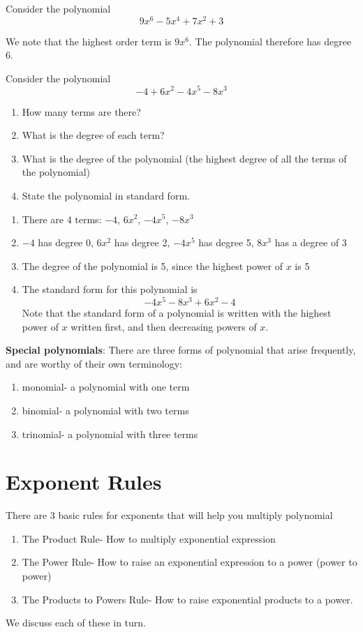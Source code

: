 \begin{myexample}
Consider the polynomial
\[
	9x^6-5x^4+7x^2+3
\]
\end{myexample}
We note that the highest order term is $9x^6$. The polynomial therefore has degree 6.
\begin{myexample}
Consider the polynomial 
\[
	-4 + 6x^2-4x^5-8x^3
\]
\begin{enumerate}
	\item How many terms are there?
	\item What is the degree of each term?
	\item What is the degree of the polynomial (the highest degree of all the terms of the polynomial)
	\item State the polynomial in standard form.
\end{enumerate} 
\end{myexample}
\begin{myProof}
	\begin{enumerate}
		\item There are 4 terms: $-4$, $6x^2$, $-4x^5$, $-8x^3$
		\item $-4$ has degree $0$, $6x^2$ has degree 2, $-4x^5$ has degree 5, $8x^3$ has a degree of 3
		\item The degree of the polynomial is 5, since the highest power of $x$ is 5
		\item The standard form for this polynomial is
		\[
			-4x^5-8x^3+6x^2-4
		\]
		Note that the standard form of a polynomial is written with the highest power
		of $x$ written first, and then decreasing powers of $x$.
	\end{enumerate} 
\end{myProof} 
\begin{myDefinition}
	{\bfseries Special polynomials}: There are three forms of polynomial that arise frequently, and are worthy of their
	own terminology:
	\begin{enumerate}
		\item \gls{monomial}- a polynomial with one term
		\item \gls{binomial}- a polynomial with two terms
		\item \Gls{trinomial}- a polynomial with three terms
	\end{enumerate} 
\end{myDefinition}
\section{Exponent Rules}
There are 3 basic rules for exponents that will help you multiply polynomial
\begin{enumerate}
	\item The Product Rule- How to multiply exponential expression
	\item The Power Rule- How to raise an exponential expression to a power (power to power)
	\item The Products to Powers Rule- How to raise exponential products to a power.
\end{enumerate} 
We discuss each of these in turn.
